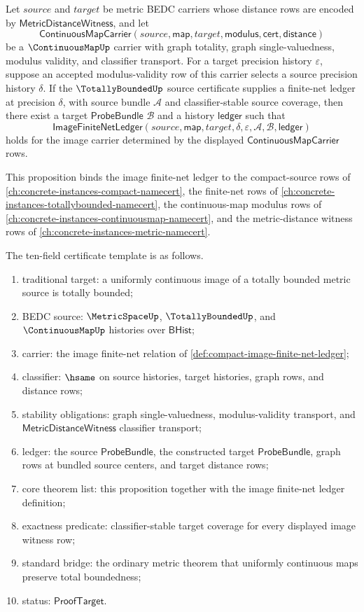 \begin{proposition}
\label{prop:uniformly-continuous-image-totally-bounded-source}
Let $source$ and $target$ be metric BEDC carriers whose distance rows are
encoded by $\mathsf{MetricDistanceWitness}$, and let
$$
\mathsf{ContinuousMapCarrier}(source,\mathsf{map},target,\mathsf{modulus},
\mathsf{cert},\mathsf{distance})
$$
be a $\ContinuousMapUp$ carrier with graph totality, graph single-valuedness,
modulus validity, and classifier transport. For a target precision history
$\varepsilon$, suppose an accepted modulus-validity row of this carrier selects
a source precision history $\delta$. If the $\TotallyBoundedUp$ source
certificate supplies a finite-net ledger at precision $\delta$, with source
bundle $\mathcal{A}$ and classifier-stable source coverage, then there exist a
target $\mathsf{ProbeBundle}$ $\mathcal{B}$ and a history
$\mathsf{ledger}$ such that
$$
\mathsf{ImageFiniteNetLedger}(source,\mathsf{map},target,\delta,\varepsilon,
\mathcal{A},\mathcal{B},\mathsf{ledger})
$$
holds for the image carrier determined by the displayed
$\mathsf{ContinuousMapCarrier}$ rows.

This proposition binds the image finite-net ledger to the compact-source rows of \autoref{ch:concrete-instances-compact-namecert}, the finite-net rows of \autoref{ch:concrete-instances-totallybounded-namecert}, the continuous-map modulus rows of \autoref{ch:concrete-instances-continuousmap-namecert}, and the metric-distance witness rows of \autoref{ch:concrete-instances-metric-namecert}.

The ten-field certificate template is as follows.
\begin{enumerate}
  \item traditional target: a uniformly continuous image of a totally bounded
  metric source is totally bounded;
  \item BEDC source: $\MetricSpaceUp$, $\TotallyBoundedUp$, and
  $\ContinuousMapUp$ histories over $\mathsf{BHist}$;
  \item carrier: the image finite-net relation of
  \autoref{def:compact-image-finite-net-ledger};
  \item classifier: $\hsame$ on source histories, target histories, graph rows,
  and distance rows;
  \item stability obligations: graph single-valuedness, modulus-validity
  transport, and $\mathsf{MetricDistanceWitness}$ classifier transport;
  \item ledger: the source $\mathsf{ProbeBundle}$, the constructed target
  $\mathsf{ProbeBundle}$, graph rows at bundled source centers, and target
  distance rows;
  \item core theorem list: this proposition together with the image finite-net
  ledger definition;
  \item exactness predicate: classifier-stable target coverage for every
  displayed image witness row;
  \item standard bridge: the ordinary metric theorem that uniformly continuous
  maps preserve total boundedness;
  \item status: $\mathsf{ProofTarget}$.
\end{enumerate}
\end{proposition}
